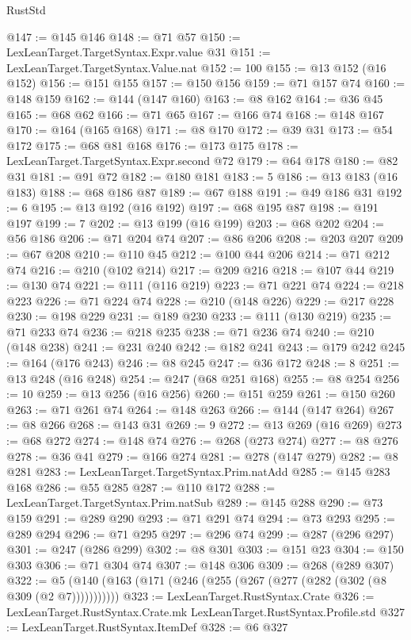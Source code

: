 \begin{lexlean}{RustStd}
\begin{coremodule}
@147 := @145 @146
@148 := @71 @57
@150 := LexLeanTarget.TargetSyntax.Expr.value @31
@151 := LexLeanTarget.TargetSyntax.Value.nat
@152 := 100
@155 := @13 @152 (@16 @152)
@156 := @151 @155
@157 := @150 @156
@159 := @71 @157 @74
@160 := @148 @159
@162 := @144 (@147 @160)
@163 := @8 @162
@164 := @36 @45
@165 := @68 @62
@166 := @71 @65
@167 := @166 @74
@168 := @148 @167
@170 := @164 (@165 @168)
@171 := @8 @170
@172 := @39 @31
@173 := @54 @172
@175 := @68 @81 @168
@176 := @173 @175
@178 := LexLeanTarget.TargetSyntax.Expr.second @72
@179 := @64 @178
@180 := @82 @31
@181 := @91 @72
@182 := @180 @181
@183 := 5
@186 := @13 @183 (@16 @183)
@188 := @68 @186 @87
@189 := @67 @188
@191 := @49 @186 @31
@192 := 6
@195 := @13 @192 (@16 @192)
@197 := @68 @195 @87
@198 := @191 @197
@199 := 7
@202 := @13 @199 (@16 @199)
@203 := @68 @202
@204 := @56 @186
@206 := @71 @204 @74
@207 := @86 @206
@208 := @203 @207
@209 := @67 @208
@210 := @110 @45
@212 := @100 @44 @206
@214 := @71 @212 @74
@216 := @210 (@102 @214)
@217 := @209 @216
@218 := @107 @44
@219 := @130 @74
@221 := @111 (@116 @219)
@223 := @71 @221 @74
@224 := @218 @223
@226 := @71 @224 @74
@228 := @210 (@148 @226)
@229 := @217 @228
@230 := @198 @229
@231 := @189 @230
@233 := @111 (@130 @219)
@235 := @71 @233 @74
@236 := @218 @235
@238 := @71 @236 @74
@240 := @210 (@148 @238)
@241 := @231 @240
@242 := @182 @241
@243 := @179 @242
@245 := @164 (@176 @243)
@246 := @8 @245
@247 := @36 @172
@248 := 8
@251 := @13 @248 (@16 @248)
@254 := @247 (@68 @251 @168)
@255 := @8 @254
@256 := 10
@259 := @13 @256 (@16 @256)
@260 := @151 @259
@261 := @150 @260
@263 := @71 @261 @74
@264 := @148 @263
@266 := @144 (@147 @264)
@267 := @8 @266
@268 := @143 @31
@269 := 9
@272 := @13 @269 (@16 @269)
@273 := @68 @272
@274 := @148 @74
@276 := @268 (@273 @274)
@277 := @8 @276
@278 := @36 @41
@279 := @166 @274
@281 := @278 (@147 @279)
@282 := @8 @281
@283 := LexLeanTarget.TargetSyntax.Prim.natAdd
@285 := @145 @283 @168
@286 := @55 @285
@287 := @110 @172
@288 := LexLeanTarget.TargetSyntax.Prim.natSub
@289 := @145 @288
@290 := @73 @159
@291 := @289 @290
@293 := @71 @291 @74
@294 := @73 @293
@295 := @289 @294
@296 := @71 @295
@297 := @296 @74
@299 := @287 (@296 @297)
@301 := @247 (@286 @299)
@302 := @8 @301
@303 := @151 @23
@304 := @150 @303
@306 := @71 @304 @74
@307 := @148 @306
@309 := @268 (@289 @307)
@322 := @5 (@140 (@163 (@171 (@246 (@255 (@267 (@277 (@282 (@302 (@8 @309 (@2 @7)))))))))))
@323 := LexLeanTarget.RustSyntax.Crate
@326 := LexLeanTarget.RustSyntax.Crate.mk LexLeanTarget.RustSyntax.Profile.std
@327 := LexLeanTarget.RustSyntax.ItemDef
@328 := @6 @327

\end{coremodule}
\end{lexlean}
